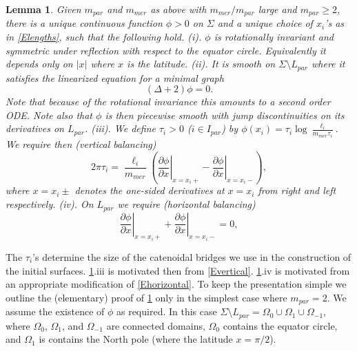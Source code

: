\documentclass[12pt,namelimits,sumlimits]{amsart}
\newtheorem{lemma}[theorem]{Lemma}
\theoremstyle{remark}
\numberwithin{equation}{section}
\begin{document}
\addtocounter{equation}{1}
\begin{lemma}
\label{Lbalanced}
Given ${{m_{par}}}$ and ${{m_{mer}}}$ as above with ${{m_{mer}}}/{{m_{par}}}$ large and ${{m_{par}}}\ge2$,
there is 
a unique continuous function $\phi>0$ on $\Sigma$ 
and a unique choice of $x_i$'s as in \ref{Elengths},
such that the following hold.
\newline
(i). $\phi$ is rotationally invariant and symmetric under reflection with respect to the equator circle.
Equivalently it depends only on $|x|$ where $x$ is the latitude.
\newline
(ii). It is smooth on $\Sigma\setminus{{L_{par}}}$ where it satisfies the linearized equation for a minimal graph
$$
(\Delta+2)\phi=0.
$$
Note that because of the rotational invariance this amounts to a second order ODE.
Note also that $\phi$ is then piecewise smooth with jump discontinuities on its derivatives on ${{L_{par}}}$.
\newline
(iii).
We define $\tau_i>0$ ($i\in{{I_{par}}}$) by 
$\phi(x_i)=\tau_i\log\frac{\ell_i}{{{m_{mer}}}\tau_i}$.
We require then (vertical balancing)
$$
2\pi\tau_i=
\frac{\ell_i}{{m_{mer}}}
\left(
\left. \frac{\partial\phi}{\partial x}\right|_{x=x_i+}
-
\left. \frac{\partial\phi}{\partial x}\right|_{x=x_i-}
\right),
$$
where ${x=x_i\pm}$ denotes the one-sided derivatives at $x=x_i$ from right and left respectively.
\newline
(iv).
On ${{L_{par}}}$ we require (horizontal balancing)
$$
\left. \frac{\partial\phi}{\partial x}\right|_{x=x_i+}
+
\left. \frac{\partial\phi}{\partial x}\right|_{x=x_i-}
=0,
$$
\end{lemma}

The $\tau_i$'s determine the size of the catenoidal bridges we use in the construction of the initial surfaces.
\ref{Lbalanced}.iii is motivated then from \ref{Evertical}.
\ref{Lbalanced}.iv is motivated from an appropriate modification of
\ref{Ehorizontal}.
To keep the presentation simple
we outline the (elementary) proof of \ref{Lbalanced}
only in the simplest case where ${{m_{par}}}=2$.
We assume the existence of $\phi$ as required.
In this case $\Sigma\setminus{{L_{par}}}=\Omega_0\cup\Omega_1\cup\Omega_{-1}$,
where $\Omega_0$, $\Omega_1$, and $\Omega_{-1}$ are connected domains,
$\Omega_0$ contains the equator circle,
and $\Omega_1$ is contains the North pole
(where the latitude $x=\pi/2$).
\end{document}
